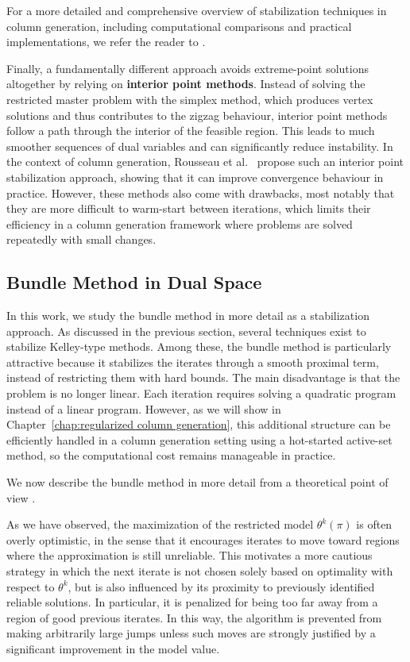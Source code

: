 \documentclass{book}
\theoremstyle{definition}
\newcounter{algorithm_}
\numberwithin{algorithm_}{chapter}
\begin{document}
For a more detailed and comprehensive overview of stabilization techniques in column generation, including computational comparisons and practical implementations, we refer the reader to \cite{briant2008, benamor2009stabilizing}.

\bigskip

Finally, a fundamentally different approach avoids extreme-point solutions altogether by relying on \textbf{interior point methods}. Instead of solving the restricted master problem with the simplex method, which produces vertex solutions and thus contributes to the zigzag behaviour, interior point methods follow a path through the interior of the feasible region. This leads to much smoother sequences of dual variables and can significantly reduce instability. In the context of column generation, Rousseau et al.~\cite{rousseau2007interior} propose such an interior point stabilization approach, showing that it can improve convergence behaviour in practice. However, these methods also come with drawbacks, most notably that they are more difficult to warm-start between iterations, which limits their efficiency in a column generation framework where problems are solved repeatedly with small changes.


\subsection{Bundle Method in Dual Space}

In this work, we study the bundle method in more detail as a stabilization approach. As discussed in the previous section, several techniques exist to stabilize Kelley-type methods. Among these, the bundle method is particularly attractive because it stabilizes the iterates through a smooth proximal term, instead of restricting them with hard bounds. The main disadvantage is that the problem is no longer linear. Each iteration requires solving a quadratic program instead of a linear program. However, as we will show in Chapter~\ref{chap:regularized column generation}, this additional structure can be efficiently handled in a column generation setting using a hot-started active-set method, so the computational cost remains manageable in practice.

We now describe the bundle method in more detail from a theoretical point of view \cite{briant2008, ruszczynski2006nonlinear}.

\bigskip

As we have observed, the maximization of the restricted model $\theta^k(\pi)$ is often overly optimistic, in the sense that it encourages iterates to move toward regions where the approximation is still unreliable. This motivates a more cautious strategy in which the next iterate is not chosen solely based on optimality with respect to $\theta^k$, but is also influenced by its proximity to previously identified reliable solutions.
In particular, it is penalized for being too far away from a region of good previous iterates. In this way, the algorithm is prevented from making arbitrarily large jumps unless such moves are strongly justified by a significant improvement in the model value.
\end{document}
